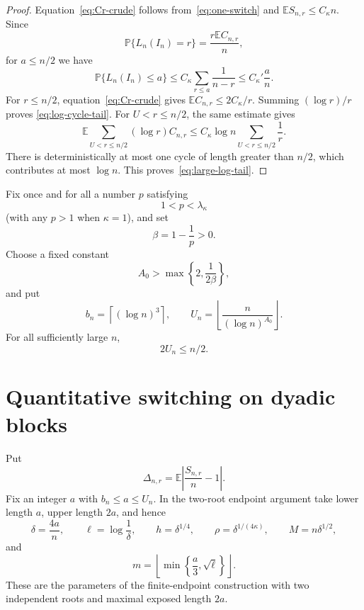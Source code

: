\documentclass[11pt]{article}
\theoremstyle{remark}
\newcommand{\Pp}{\mathbb P}
\newcommand{\Ee}{\mathbb E}
\begin{document}
\begin{proof}
Equation~\eqref{eq:Cr-crude} follows from~\eqref{eq:one-switch} and
$\Ee S_{n,r}\leq C_\kappa n$.  Since
\[
 \Pp\{L_n(I_n)=r\}=\frac{r\Ee C_{n,r}}n,
\]
for $a\leq n/2$ we have
\[
 \Pp\{L_n(I_n)\leq a\}
 \leq C_\kappa\sum_{r\leq a}\frac1{n-r}
 \leq C_\kappa'\frac an.
\]
For $r\leq n/2$, equation~\eqref{eq:Cr-crude} gives
$\Ee C_{n,r}\leq 2C_\kappa/r$.  Summing $(\log r)/r$ proves
\eqref{eq:log-cycle-tail}.  For $U<r\leq n/2$, the same estimate gives
\[
 \Ee\sum_{U<r\leq n/2}(\log r)C_{n,r}
 \leq C_\kappa\log n\sum_{U<r\leq n/2}\frac1r.
\]
There is deterministically at most one cycle of length greater than $n/2$,
which contributes at most $\log n$.  This proves~\eqref{eq:large-log-tail}.
\end{proof}

Fix once and for all a number $p$ satisfying
\[
 1<p<\lambda_\kappa
\]
(with any $p>1$ when $\kappa=1$), and set
\[
 \beta=1-\frac1p>0.
\]
Choose a fixed constant
\begin{equation}\label{eq:A0-choice}
 A_0>\max\left\{2,\frac1{2\beta}\right\},
\end{equation}
and put
\begin{equation}\label{eq:cutoffs}
 b_n=\left\lceil(\log n)^3\right\rceil,
 \qquad
 U_n=\left\lfloor\frac{n}{(\log n)^{A_0}}\right\rfloor.
\end{equation}
For all sufficiently large $n$,
\begin{equation}\label{eq:cutoff-range}
 2U_n\leq n/2.
\end{equation}

\section{Quantitative switching on dyadic blocks}

Put
\[
 \Delta_{n,r}=\Ee\left|\frac{S_{n,r}}n-1\right|.
\]
Fix an integer $a$ with $b_n\leq a\leq U_n$.  In the two-root endpoint
argument take lower length $a$, upper length $2a$, and hence
\begin{equation}\label{eq:block-parameters}
 \delta=\frac{4a}{n},\qquad
 \ell=\log\frac1\delta,\qquad
 h=\delta^{1/4},\qquad
 \rho=\delta^{1/(4\kappa)},\qquad
 M=n\delta^{1/2},
\end{equation}
and
\begin{equation}\label{eq:m-def}
 m=\left\lfloor\min\left\{\frac a3,\sqrt\ell\right\}\right\rfloor.
\end{equation}
These are the parameters of the finite-endpoint construction with two
independent roots and maximal exposed length $2a$.
\end{document}
